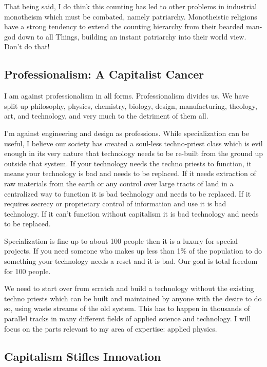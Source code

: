 That being said, I do think this counting has led to other problems in
industrial monotheism which must be combated, namely patriarchy.
Monotheistic religions have a strong tendency to extend the counting
hierarchy from their bearded man-god down to all Things, building an
instant patriarchy into their world view. Don't do that!

\subsection{Professionalism: A Capitalist
Cancer}\label{professionalism-a-capitalist-cancer}

I am against professionalism in all forms. Professionalism divides us.
We have split up philosophy, physics, chemistry, biology, design,
manufacturing, theology, art, and technology, and very much to the
detriment of them all.

I'm against engineering and design as professions. While specialization
can be useful, I believe our society has created a soul-less
techno-priest class which is evil enough in its very nature that
technology needs to be re-built from the ground up outside that system.
If your technology needs the techno priests to function, it means your
technology is bad and needs to be replaced. If it needs extraction of
raw materials from the earth or any control over large tracts of land in
a centralized way to function it is bad technology and needs to be
replaced. If it requires secrecy or proprietary control of information
and use it is bad technology. If it can't function without capitalism it
is bad technology and needs to be replaced.

Specialization is fine up to about 100 people then it is a luxury for
special projects. If you need someone who makes up less than 1\% of the
population to do something your technology needs a reset and it is bad.
Our goal is total freedom for 100 people.

We need to start over from scratch and build a technology without the
existing techno priests which can be built and maintained by anyone with
the desire to do so, using waste streams of the old system. This has to
happen in thousands of parallel tracks in many different fields of
applied science and technology. I will focus on the parts relevant to my
area of expertise: applied physics.

\subsection{Capitalism Stifles
Innovation}\label{capitalism-stifles-innovation}

